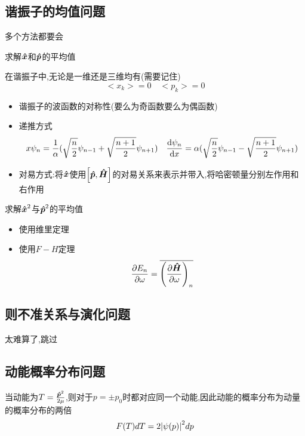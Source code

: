 \documentclass{article}
\begin{document}
        \subsection{谐振子的均值问题}
            多个方法都要会
            \begin{formal}

                求解$\vu*{x}$和$\vu*{p}$的平均值

                在谐振子中,无论是一维还是三维均有(需要记住)
                $$ <x_{k}> = 0 \quad <p_{k}> = 0 $$
                \begin{itemize}
                    \item   谐振子的波函数的对称性(要么为奇函数要么为偶函数)
                    \item   递推方式 
                    $$  
                    x \psi_{n} = \frac{1}{\alpha}(\sqrt{\frac{n}{2}}\psi_{n-1} + \sqrt{\frac{n+1}{2}} \psi_{n+1})  
                    \quad \dv{\psi_{n}}{x} = \alpha (\sqrt{\frac{n}{2}}\psi_{n-1} - \sqrt{\frac{n+1}{2}} \psi_{n+1}) 
                    $$
                    \item   对易方式:将$\vu*{x}$使用$\comm{\vu*{p}}{\vu*{H}}$的对易关系来表示并带入,将哈密顿量分别左作用和右作用
                \end{itemize}

                求解$\vu*{x}^{2}$与$\vu*{p}^{2}$的平均值
                \begin{itemize}
                    \item 使用维里定理
                    \item 使用$F-H$定理
                    $$ \pdv{E_{n}}{\omega}  = \overline{\qty(\pdv{\vu*{H}}{\omega})_{n}} $$
                \end{itemize}

            \end{formal}


        \subsection{则不准关系与演化问题}
            太难算了,跳过
        \subsection{动能概率分布问题}
            当动能为$T = \frac{\vu*{p}^{2}}{2 \mu}$,则对于$p=\pm p_{0}$时都对应同一个动能,因此动能的概率分布为动量的概率分布的两倍
            $$ F(T)dT = 2 \abs{\psi(p)}^{2} dp $$
\end{document}
